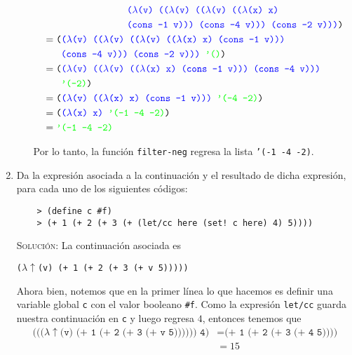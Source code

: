 \documentclass[letterpaper,11pt]{article}
\begin{document}
\begin{enumerate}
\begin{enumerate}
\begin{align*}
            & \quad \quad \quad \quad \quad \quad \quad \quad \; \;
            \texttt{\textcolor{blue}{($\lambda$(v) (($\lambda$(v) (($\lambda$(v) (($\lambda$(x) x)}} \\ 
            & \quad \quad \quad \quad \quad \quad \quad \quad \; \;
            \texttt{\textcolor{blue}{(cons -1 v))) (cons -4 v))) (cons -2 v)))})} \\ 
            &= \texttt{(\textcolor{blue}{($\lambda$(v) (($\lambda$(v) (($\lambda$(v) (($\lambda$(x) x) (cons -1 v)))}} \\ 
            & \quad \; \; \; 
            \texttt{\textcolor{blue}{(cons -4 v))) (cons -2 v)))}  \textcolor{green}{'()})} \\ 
            &= \texttt{(\textcolor{blue}{($\lambda$(v) (($\lambda$(v) (($\lambda$(x) x) (cons -1 v))) (cons -4 v)))}} \\ 
            & \quad \; \; \; 
            \texttt{\textcolor{green}{'(-2)})} \\ 
            &= \texttt{(\textcolor{blue}{($\lambda$(v) (($\lambda$(x) x) (cons -1 v)))}
                        \textcolor{green}{'(-4 -2)})} \\ 
            &= \texttt{(\textcolor{blue}{($\lambda$(x) x)}
                        \textcolor{green}{'(-1 -4 -2)})} \\
            &= \texttt{\textcolor{green}{'(-1 -4 -2)}}
        \end{align*}

        Por lo tanto, la función \texttt{filter-neg} regresa la lista \texttt{'(-1 -4 -2)}.
    \end{enumerate}

    \item Da la expresión asociada a la continuación y el resultado de dicha 
    expresión, para cada uno de los siguientes códigos:
    \begin{verbatim}
    > (define c #f)
    > (+ 1 (+ 2 (+ 3 (+ (let/cc here (set! c here) 4) 5))))
    \end{verbatim}

    \textsc{Solución:} La continuación asociada es
    \begin{center}
        \texttt{($\lambda \uparrow$(v) (+ 1 (+ 2 (+ 3 (+ v 5)))))}
    \end{center}

    Ahora bien, notemos que en la primer línea lo que hacemos es definir una 
    variable global \texttt{c} con el valor booleano \texttt{\#f}. Como la 
    expresión \texttt{let/cc} guarda nuestra continuación en \texttt{c} y 
    luego regresa $4$, entonces tenemos que 
    \begin{align*}
        \texttt{((($\lambda \uparrow$(v) (+ 1 (+ 2 (+ 3 (+ v 5)))))) 4)}
        &= \texttt{(+ 1 (+ 2 (+ 3 (+ 4 5))))} \\ 
        &= 15
    \end{align*}


\end{enumerate}
\end{document}
